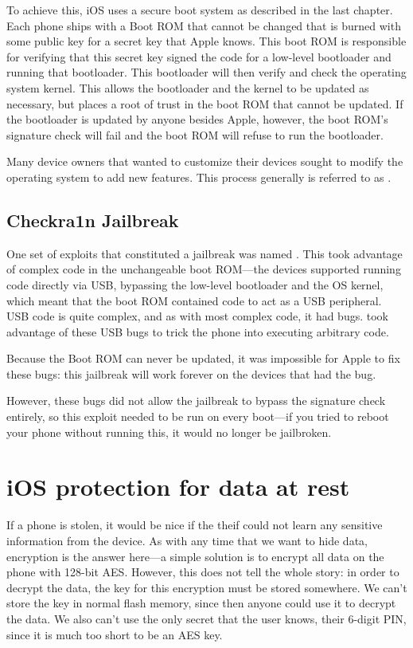 To achieve this, iOS uses a secure boot system as described in the last chapter. Each phone ships with a Boot ROM that cannot be changed that is burned with some public key for a secret key that Apple knows. This boot ROM is responsible for verifying that this secret key signed the code for a low-level bootloader and running that bootloader. This bootloader will then verify and check the operating system kernel. This allows the bootloader and the kernel to be updated as necessary, but places a root of trust in the boot ROM that cannot be updated. If the bootloader is updated by anyone besides Apple, however, the boot ROM's signature check will fail and the boot ROM will refuse to run the bootloader. 

Many device owners that wanted to customize their devices sought to modify the operating system to add new features. This process generally is referred to as .

\subsection{Checkra1n Jailbreak}
One set of exploits that constituted a jailbreak was named . This took advantage of complex code in the unchangeable boot ROM---the devices supported running code directly via USB, bypassing the low-level bootloader and the OS kernel, which meant that the boot ROM contained code to act as a USB peripheral. USB code is quite complex, and as with most complex code, it had bugs.  took advantage of these USB bugs to trick the phone into executing arbitrary code.

Because the Boot ROM can never be updated, it was impossible for Apple to fix these bugs: this jailbreak will work forever on the devices that had the bug. 

However, these bugs did not allow the jailbreak to bypass the signature check entirely, so this exploit needed to be run on every boot---if you tried to reboot your phone without running this, it would no longer be jailbroken.

\section{iOS protection for data at rest}
If a phone is stolen, it would be nice if the theif could not learn any sensitive information from the device. As with any time that we want to hide data, encryption is the answer here---a simple solution is to encrypt all data on the phone with 128-bit AES. However, this does not tell the whole story: in order to decrypt the data, the key for this encryption must be stored somewhere. We can't store the key in normal flash memory, since then anyone could use it to decrypt the data. We also can't use the only secret that the user knows, their 6-digit PIN, since it is much too short to be an AES key.

